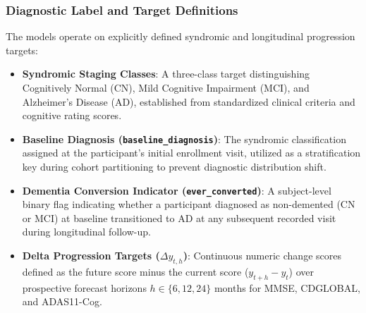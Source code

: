 \documentclass[11pt,a4paper]{article}
\begin{document}
\subsubsection*{Diagnostic Label and Target Definitions}
The models operate on explicitly defined syndromic and longitudinal progression targets:
\begin{itemize}
    \item \textbf{Syndromic Staging Classes}: A three-class target distinguishing Cognitively Normal (CN), Mild Cognitive Impairment (MCI), and Alzheimer's Disease (AD), established from standardized clinical criteria and cognitive rating scores.
    \item \textbf{Baseline Diagnosis (\texttt{baseline\_diagnosis})}: The syndromic classification assigned at the participant's initial enrollment visit, utilized as a stratification key during cohort partitioning to prevent diagnostic distribution shift.
    \item \textbf{Dementia Conversion Indicator (\texttt{ever\_converted})}: A subject-level binary flag indicating whether a participant diagnosed as non-demented (CN or MCI) at baseline transitioned to AD at any subsequent recorded visit during longitudinal follow-up.
    \item \textbf{Delta Progression Targets ($\Delta y_{t, h}$)}: Continuous numeric change scores defined as the future score minus the current score ($y_{t+h} - y_t$) over prospective forecast horizons $h \in \{6, 12, 24\}$ months for MMSE, CDGLOBAL, and ADAS11-Cog.
\end{itemize}
\end{document}
